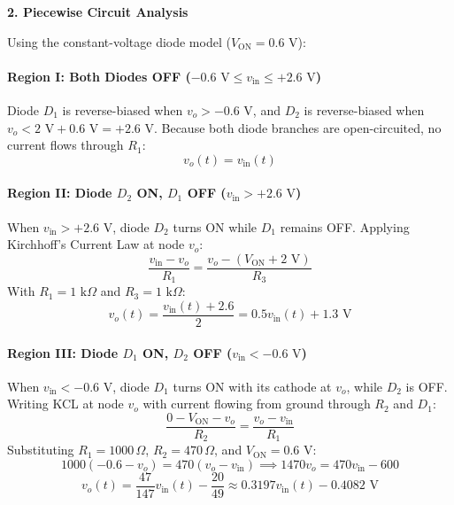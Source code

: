 \noindent\textbf{2. Piecewise Circuit Analysis}\par\noindent
Using the constant-voltage diode model ($V_{\text{ON}} = 0.6\text{ V}$):

\paragraph{Region I: Both Diodes OFF ($-0.6\text{ V} \le v_{\text{in}} \le +2.6\text{ V}$)}
Diode $D_1$ is reverse-biased when $v_o > -0.6\text{ V}$, and $D_2$ is reverse-biased when $v_o < 2\text{ V} + 0.6\text{ V} = +2.6\text{ V}$. Because both diode branches are open-circuited, no current flows through $R_1$:
\begin{equation}
    v_o(t) = v_{\text{in}}(t)
\end{equation}

\paragraph{Region II: Diode $D_2$ ON, $D_1$ OFF ($v_{\text{in}} > +2.6\text{ V}$)}
When $v_{\text{in}} > +2.6\text{ V}$, diode $D_2$ turns ON while $D_1$ remains OFF. Applying Kirchhoff's Current Law at node $v_o$:
\begin{equation}
    \frac{v_{\text{in}} - v_o}{R_1} = \frac{v_o - (V_{\text{ON}} + 2\text{ V})}{R_3}
\end{equation}
With $R_1 = 1\text{ k}\Omega$ and $R_3 = 1\text{ k}\Omega$:
\begin{equation}
    v_o(t) = \frac{v_{\text{in}}(t) + 2.6}{2} = 0.5 v_{\text{in}}(t) + 1.3\text{ V}
\end{equation}

\paragraph{Region III: Diode $D_1$ ON, $D_2$ OFF ($v_{\text{in}} < -0.6\text{ V}$)}
When $v_{\text{in}} < -0.6\text{ V}$, diode $D_1$ turns ON with its cathode at $v_o$, while $D_2$ is OFF. Writing KCL at node $v_o$ with current flowing from ground through $R_2$ and $D_1$:
\begin{equation}
    \frac{0 - V_{\text{ON}} - v_o}{R_2} = \frac{v_o - v_{\text{in}}}{R_1}
\end{equation}
Substituting $R_1 = 1000\,\Omega$, $R_2 = 470\,\Omega$, and $V_{\text{ON}} = 0.6\text{ V}$:
\begin{equation}
    1000(-0.6 - v_o) = 470(v_o - v_{\text{in}}) \implies 1470 v_o = 470 v_{\text{in}} - 600
\end{equation}
\begin{equation}
    v_o(t) = \frac{47}{147} v_{\text{in}}(t) - \frac{20}{49} \approx 0.3197 v_{\text{in}}(t) - 0.4082\text{ V}
\end{equation}


